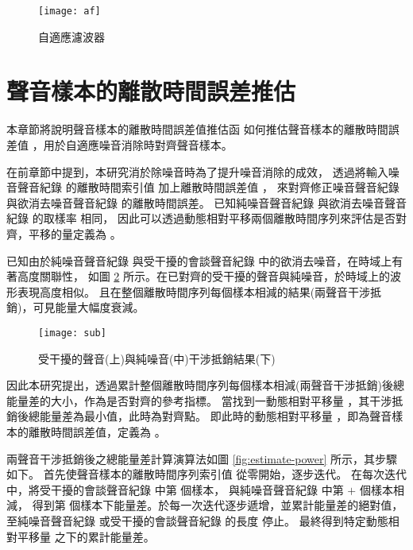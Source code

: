 \begin{figure}[H]
    \centering
    \texttt{[image: af]}
    \caption{自適應濾波器}\label{fig:af}
\end{figure}


\section{聲音樣本的離散時間誤差推估}\label{sec:estimate}

    本章節將說明聲音樣本的離散時間誤差值推估函 \DEFfuncEstm{}
如何推估聲音樣本的離散時間誤差值 \DEFshift，用於自適應噪音消除時對齊聲音樣本。

    在前章節中提到，本研究消於除噪音時為了提升噪音消除的成效，
透過將輸入噪音聲音紀錄 \DEFrecN 的離散時間索引值 \DEFtimeLen 加上離散時間誤差值 \DEFshift，
來對齊修正噪音聲音紀錄 \DEFrecN 與欲消去噪音聲音紀錄 \DEFrecJ 的離散時間誤差。
已知純噪音聲音紀錄 \DEFrecN 與欲消去噪音聲音紀錄 \DEFrecJ 的取樣率 \DEFsamplerate 相同，
因此可以透過動態相對平移兩個離散時間序列來評估是否對齊，平移的量定義為 \DEFcandiSFT。

    已知由於純噪音聲音紀錄 \DEFrecN 與受干擾的會談聲音紀錄 \DEFrecJ 中的欲消去噪音，在時域上有著高度關聯性，
如圖 \ref{fig:estimate-sub} 所示。在已對齊的受干擾的聲音與純噪音，於時域上的波形表現高度相似。
且在整個離散時間序列每個樣本相減的結果(兩聲音干涉抵銷)，可見能量大幅度衰減。

\begin{figure}[H]
    \centering
    \texttt{[image: sub]}
    \caption{受干擾的聲音(上)與純噪音(中)干涉抵銷結果(下)}\label{fig:estimate-sub}
\end{figure}

    因此本研究提出，透過累計整個離散時間序列每個樣本相減(兩聲音干涉抵銷)後總能量差的大小，作為是否對齊的參考指標。
當找到一動態相對平移量 \DEFcandiSFT ，其干涉抵銷後總能量差為最小值，此時為對齊點。
即此時的動態相對平移量 \DEFcandiSFT，即為聲音樣本的離散時間誤差值，定義為 \DEFshift。

    兩聲音干涉抵銷後之總能量差計算演算法如圖 \ref{fig:estimate-power} 所示，其步驟如下。
首先使聲音樣本的離散時間序列索引值 \DEFpause 從零開始，逐步迭代。
在每次迭代中，將受干擾的會談聲音紀錄 \DEFrecJ 中第 \DEFpause  個樣本，
與純噪音聲音紀錄 \DEFrecN 中第 \DEFpause $+$ \DEFcandiSFT 個樣本相減，
得到第 \DEFpause 個樣本下能量差。\DEFpause 於每一次迭代逐步遞增，並累計能量差的絕對值，
至純噪音聲音紀錄 \DEFrecN 或受干擾的會談聲音紀錄 \DEFrecJ 的長度 \DEFtimeLen 停止。
最終得到特定動態相對平移量 \DEFcandiSFT 之下的累計能量差。

